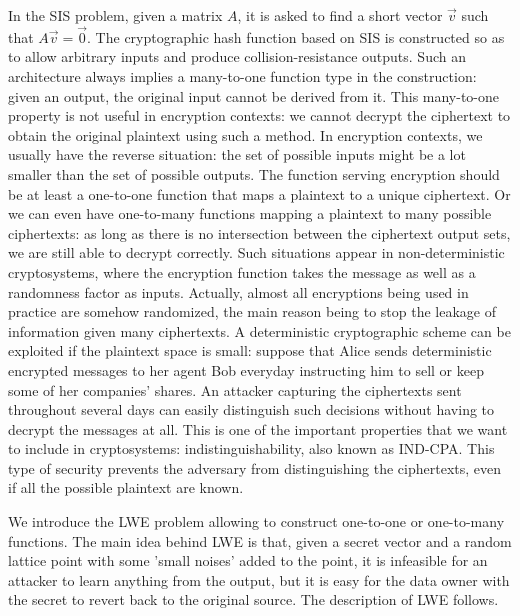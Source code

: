 In the SIS problem, given a matrix $A$, it is asked to find a short vector
$\vec{v}$ such that $A\vec{v} = \vec{0}$. The cryptographic hash function 
 based on SIS is constructed so as to allow arbitrary inputs and
produce collision-resistance outputs. Such an architecture always implies a
many-to-one function type in the construction: given an output, the original input cannot be derived from it. This many-to-one property is not useful
in encryption contexts: we cannot decrypt the ciphertext to obtain the original
plaintext using such a method. In encryption contexts, we usually have the reverse
situation: the set of possible inputs might be a lot smaller than the set of
possible outputs. The function serving encryption should be at least a
one-to-one function that maps a plaintext to a unique ciphertext. Or we can even
have one-to-many functions mapping a plaintext to many possible ciphertexts: as
long as there is no intersection between the ciphertext output sets, we are
still able to decrypt correctly. Such situations appear in non-deterministic
cryptosystems, where the encryption function takes the message as well as a
randomness factor as inputs. Actually, almost all encryptions being used in
practice are somehow randomized, the main reason being to stop the leakage of
information given many ciphertexts. A deterministic cryptographic scheme can be
exploited if the plaintext space is small: suppose that Alice sends deterministic encrypted messages to her agent Bob everyday instructing him to sell or keep some of her companies' shares.  An attacker capturing the ciphertexts sent throughout several days can easily distinguish such decisions without having to decrypt the messages at all. This is one of the important properties that we want to include in cryptosystems: indistinguishability, also known as IND-CPA. This type of security prevents the adversary from distinguishing
the ciphertexts, even if all the possible plaintext are known.

We introduce the LWE problem \cite{regev2005lattices} allowing to construct
one-to-one or one-to-many functions. The main idea behind LWE is that, given a secret
vector and a random lattice point with some 'small noises' added to the point,
it is infeasible for an attacker to learn anything from the output, but it is
easy for the data owner with the secret to revert back to the original source. The
description of LWE follows.


